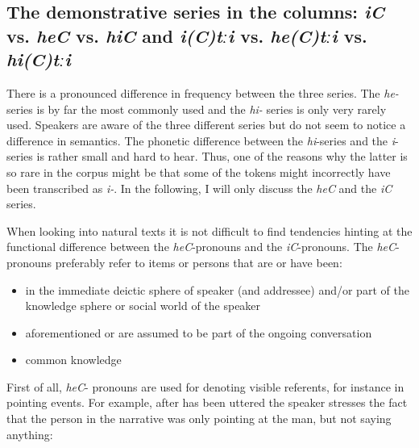 
\subsection{The demonstrative series in the columns: \textit{iC} vs. \textit{heC} vs. \textit{hiC} and \textit{i(C)tːi} vs. \textit{he(C)tːi} vs. \textit{hi(C)tːi}}
\label{ssec:The vertical dimension: iC vs. heC vs. hiC and i(C)tːi vs. he(C)tːi vs. hi(C)tːi}

There is a pronounced difference in frequency between the three series. The \textit{he-} series is by far the most commonly used and the \textit{hi-} series is only very rarely used. Speakers are aware of the three different series but do not seem to notice a difference in semantics. The phonetic difference between the \textit{hi}-series and the \textit{i}-series is rather small and hard to hear. Thus, one of the reasons why the latter is so rare in the corpus might be that some of the tokens might incorrectly have been transcribed as \textit{i-}. In the following, I will only discuss the \textit{heC} and the \textit{iC} series.

When looking into natural texts it is not difficult to find tendencies hinting at the functional difference between the \textit{heC}-pronouns and the \textit{iC}-pronouns. The \textit{heC}-pronouns preferably refer to items or persons that are or have been:

\begin{itemize}
	\item	in the immediate deictic sphere of speaker (and addressee) and/or part of the knowledge sphere or social world of the speaker
	\item	aforementioned or are assumed to be part of the ongoing conversation
	\item	common knowledge
\end{itemize}

First of all, \textit{heC}- pronouns are used for denoting visible referents, for instance in pointing events. For example, after  has been uttered the speaker stresses the fact that the person in the narrative was only pointing at the man, but not saying anything:

